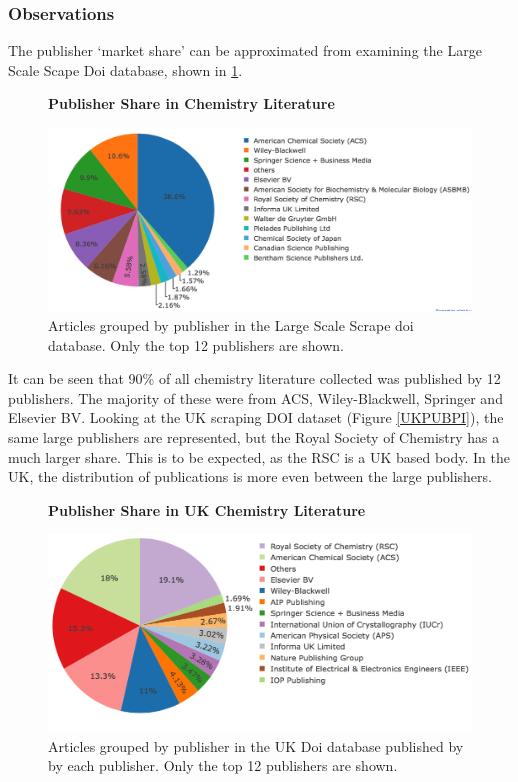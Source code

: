 \subsubsection{Observations}
The publisher `market share' can be approximated from examining the Large Scale Scape Doi database, shown in \ref{fig:PUBPI}. 
\begin{figure}[H]
    \centering
    \textbf{Publisher Share in Chemistry Literature}\par\medskip
    \includegraphics[scale=0.4]{Data_Acquisition/publishers_pie.png}
    \caption{Articles grouped by publisher in the Large Scale Scrape doi database. Only the top 12 publishers are shown.}
     \label{fig:PUBPI}
\end{figure}
It can be seen that 90\% of all chemistry literature collected was published by 12 publishers. The majority of these were from ACS, Wiley-Blackwell, Springer and Elsevier BV. Looking at the UK scraping DOI dataset (Figure \ref{UKPUBPI}), the same large publishers are represented, but the Royal Society of Chemistry has a much larger share. This is to be expected, as the RSC is a UK based body. In the UK, the distribution of publications is more even between the large publishers. 

\begin{figure}[H]
    \centering
    \textbf{Publisher Share in UK Chemistry Literature}\par\medskip
    \includegraphics[scale=0.4]{Data_Acquisition/uk_publishers_pie.png}
    \caption{Articles grouped by publisher in the UK Doi database published by by each publisher. Only the top 12 publishers are shown.}
     \label{fig:UKPUBPI}
\end{figure}


